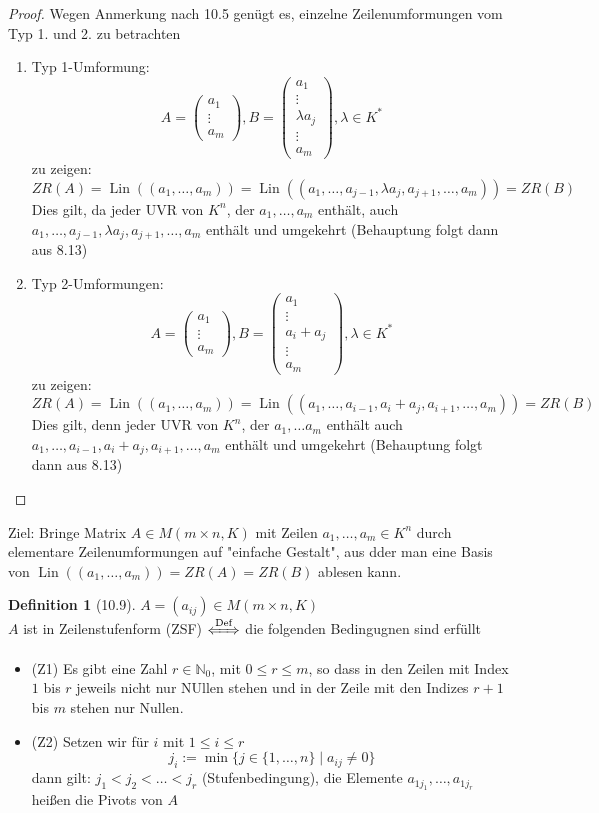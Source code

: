 \documentclass[a4paper]{scrartcl}
\DeclareMathOperator{\Lin}{Lin}
\theoremstyle{definition}
\newtheorem{defn}{Definition}
\theoremstyle{plain}
\theoremstyle{plain}
\theoremstyle{remark}
\theoremstyle{remark}
\theoremstyle{remark}
\theoremstyle{remark}
\theoremstyle{remark}
\begin{document}
\begin{proof}
Wegen Anmerkung nach 10.5 genügt es, einzelne Zeilenumformungen vom Typ 1. und 2. zu betrachten
\begin{enumerate}
\item Typ 1-Umformung:
\[A = \begin{pmatrix} a_1 \\ \vdots \\ a_m \end{pmatrix}, B = \begin{pmatrix} a_1 \\ \vdots \\ \lambda a_j \\ \vdots \\ a_m\end{pmatrix}, \lambda \in K^\ast\]
zu zeigen: \[ZR(A) = \Lin((a_1, \ldots, a_m)) = \Lin((a_1, \ldots, a_{j - 1}, \lambda a_j, a_{j + 1},\ldots, a_m)) = ZR(B)\]
Dies gilt, da jeder UVR von $K^n$, der $a_1, \ldots, a_m$ enthält, auch $a_1, \ldots, a_{j -1}, \lambda a_j, a_{j + 1}, \ldots, a_m$ enthält und umgekehrt (Behauptung folgt dann aus 8.13)
\item Typ 2-Umformungen:
\[A = \begin{pmatrix} a_1 \\ \vdots \\ a_m \end{pmatrix}, B = \begin{pmatrix} a_1 \\ \vdots \\ a_i + a_j \\ \vdots \\ a_m\end{pmatrix}, \lambda \in K^\ast\]
zu zeigen:
\[ZR(A) = \Lin((a_1, \ldots, a_m)) = \Lin((a_1, \ldots, a_{i - 1}, a_i + a_j, a_{i + 1}, \ldots, a_m)) = ZR(B)\]
Dies gilt, denn jeder UVR von $K^n$, der $a_1, \ldots a_m$ enthält auch $a_1, \ldots, a_{i - 1}, a_i + a_j, a_{i + 1}, \ldots, a_m$ enthält und umgekehrt (Behauptung folgt dann aus 8.13)
\end{enumerate}
\end{proof}
Ziel: Bringe Matrix $A \in M(m\times n, K)$ mit Zeilen $a_1, \ldots, a_m \in K^n$ durch elementare Zeilenumformungen auf "einfache Gestalt", aus dder man eine Basis von $\Lin((a_1, \dots, a_m)) = ZR(A) = ZR(B)$
ablesen kann.
\begin{defn}[10.9]
$A = (a_{ij}) \in M(m\times n, K)$ \\
  $A$ ist in Zeilenstufenform (ZSF) $\xLeftrightarrow{\text{Def}}$ die folgenden Bedingugnen sind erfüllt
\begin{itemize}
\item (Z1) Es gibt eine Zahl $r\in\mathbb{N}_0$, mit $0\leq r \leq m$, so dass in den Zeilen mit Index $1$ bis $r$ jeweils nicht nur NUllen stehen und in der Zeile mit den Indizes $r + 1$ bis $m$ stehen nur Nullen.
\item (Z2) Setzen wir für $i$ mit $1 \leq i \leq r$
    \[j_{i} := \min\{j\in \{1, \ldots, n\} \mid a_{ij} \neq 0\}\]
    dann gilt: $j_1 < j_2 < \ldots < j_r$ (Stufenbedingung), die Elemente $a_{1j_1}, \ldots, a_{1j_r}$ heißen die Pivots von $A$
\end{itemize}
\end{defn}
\end{document}
